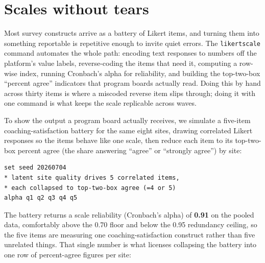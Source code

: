 \documentclass[
    a4paper,
    fontsize=10pt,
    twoside=true,
    numbers=noenddot,
]{kaobook}
\begin{document}
\section{Scales without tears}
Most survey constructs arrive as a battery of Likert items, and turning them into something reportable is repetitive enough to invite quiet errors. The \texttt{likertscale} command automates the whole path: encoding text responses to numbers off the platform's value labels, reverse-coding the items that need it, computing a row-wise index, running Cronbach's alpha for reliability, and building the top-two-box \enquote{percent agree} indicators that program boards actually read. Doing this by hand across thirty items is where a miscoded reverse item slips through; doing it with one command is what keeps the scale replicable across waves.

To show the output a program board actually receives, we simulate a five-item coaching-satisfaction battery for the same eight sites, drawing correlated Likert responses so the items behave like one scale, then reduce each item to its top-two-box percent agree (the share answering \enquote{agree} or \enquote{strongly agree}) by site:
{\footnotesize
\begin{verbatim}
set seed 20260704
* latent site quality drives 5 correlated items,
* each collapsed to top-two-box agree (=4 or 5)
alpha q1 q2 q3 q4 q5
\end{verbatim}
}
The battery returns a scale reliability (Cronbach's alpha) of \textbf{0.91} on the pooled data, comfortably above the 0.70 floor and below the 0.95 redundancy ceiling, so the five items are measuring one coaching-satisfaction construct rather than five unrelated things. That single number is what licenses collapsing the battery into one row of percent-agree figures per site:
\end{document}
